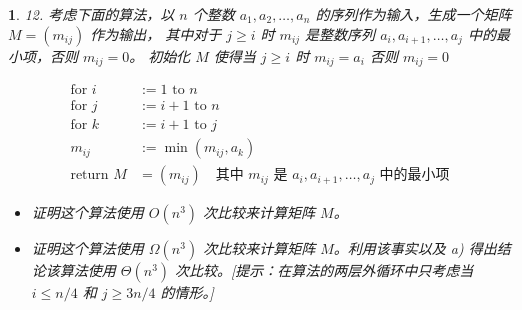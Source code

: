 \documentclass[UTF8]{report}
\theoremstyle{MyLineTheoremStyle} %
\theoremstyle{MyBlockTheoremStyle} %
\theoremstyle{MySubsubsectionStyle} %
\newtheorem{definition}{}
\begin{document}
\begin{definition}
    12. 考虑下面的算法，以 \( n \) 个整数 \( a_1, a_2, \ldots, a_n \) 的序列作为输入，生成一个矩阵 \( M = (m_{ij}) \) 作为输出，
    其中对于 \( j \geq i \) 时 \( m_{ij} \) 是整数序列 \( a_i, a_{i+1}, \ldots, a_j \) 中的最小项，否则 \( m_{ij} = 0 \)。
    初始化 \( M \) 使得当 \( j \geq i \) 时 \( m_{ij} = a_i \) 否则 \( m_{ij} = 0 \)
   
    \begin{align*}
        \text{for } i &:= 1 \text{ to } n \\
            \text{for } j &:= i + 1 \text{ to } n \\
                \text{for } k &:= i + 1 \text{ to } j \\
                    m_{ij} &:= \min(m_{ij}, a_k) \\
        \text{return } M &= (m_{ij}) \quad \text{其中 } m_{ij} \text{ 是 } a_i, a_{i+1}, \ldots, a_j \text{ 中的最小项}
        \end{align*}
    \begin{itemize}
        \item[a)] 证明这个算法使用 \( O(n^3) \) 次比较来计算矩阵 \( M \)。
        \item[b)] 证明这个算法使用 \( \Omega(n^3) \) 次比较来计算矩阵 \( M \)。利用该事实以及 a) 得出结论该算法使用 \( \Theta(n^3) \) 次比较。[提示：在算法的两层外循环中只考虑当 \( i \leq n/4 \) 和 \( j \geq 3n/4 \) 的情形。]
    \end{itemize}
\end{definition}
\end{document}
